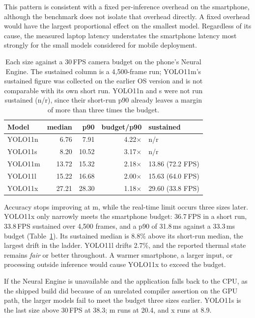 This pattern is consistent with a fixed per-inference overhead on the
smartphone, although the benchmark does not isolate that overhead directly. A
fixed overhead would have the largest proportional effect on the smallest
model. Regardless of its cause, the measured laptop latency understates the
smartphone latency most strongly for the small models considered for mobile
deployment.

\begin{table}[t]
\caption{Each size against a 30\,FPS camera budget on the phone's Neural
Engine. The sustained column is a 4{,}500-frame run; YOLO11m's sustained figure
was collected on the earlier OS version and is not comparable with its own
short run. YOLO11n and s were not run sustained (n/r), since their short-run
p90 already leaves a margin of more than three times the budget.}
\label{tab:budget}
\centering
\begin{tabular}{lrrrl}
\toprule
Model & median & p90 & budget/p90 & sustained \\
\midrule
YOLO11n & 6.76 & 7.91 & 4.22$\times$ & n/r \\
YOLO11s & 8.20 & 10.52 & 3.17$\times$ & n/r \\
YOLO11m & 13.72 & 15.32 & 2.18$\times$ & 13.86 (72.2 FPS) \\
YOLO11l & 15.22 & 16.68 & 2.00$\times$ & 15.63 (64.0 FPS) \\
YOLO11x & 27.21 & 28.30 & 1.18$\times$ & 29.60 (33.8 FPS) \\
\bottomrule
\end{tabular}
\end{table}

Accuracy stops improving at m, while the real-time limit occurs three sizes
later. YOLO11x only narrowly meets the smartphone budget: 36.7\,FPS in a short
run, 33.8\,FPS sustained over 4{,}500 frames, and a p90 of 31.8\,ms against a
33.3\,ms budget (Table~\ref{tab:budget}). Its sustained median is 8.8\% above
its short-run median, the largest drift in the ladder. YOLO11l drifts 2.7\%,
and the reported thermal state remains \emph{fair} or better throughout. A
warmer smartphone, a larger input, or processing outside inference would cause
YOLO11x to exceed the budget.

If the Neural Engine is unavailable and the application falls back to the CPU,
as the shipped build did because of an unrelated compiler assertion on the GPU
path, the larger models fail to meet the budget three sizes earlier. YOLO11s is
the last size above 30\,FPS at 38.3; m runs at 20.4, and x runs at 8.9.

